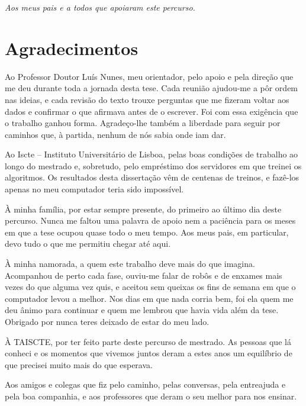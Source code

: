 \documentclass[12pt,reqno, twoside]{amsbook}
\theoremstyle{plain}
\numberwithin{equation}{chapter}
\newenvironment{dedication}
  {\thispagestyle{empty}
   \vspace*{\stretch{1}}
   \itshape
   \raggedleft
  }
  {\par
   \vspace{\stretch{3}}
  }
\numberwithin{section}{chapter}
\numberwithin{table}{chapter}
\numberwithin{figure}{chapter}
\begin{document}
\begin{dedication}
\begin{flushright}
\textit{Aos meus pais e a todos que apoiaram este percurso.}
\end{flushright}
\end{dedication}

\setcounter{page}{1}

\chapter*{Agradecimentos}
Ao Professor Doutor Luís Nunes, meu orientador, pelo apoio e pela direção que me deu durante toda a jornada desta tese. Cada reunião ajudou-me a pôr ordem nas ideias, e cada revisão do texto trouxe perguntas que me fizeram voltar aos dados e confirmar o que afirmava antes de o escrever. Foi com essa exigência que o trabalho ganhou forma. Agradeço-lhe também a liberdade para seguir por caminhos que, à partida, nenhum de nós sabia onde iam dar.

Ao Iscte -- Instituto Universitário de Lisboa, pelas boas condições de trabalho ao longo do mestrado e, sobretudo, pelo empréstimo dos servidores em que treinei os algoritmos. Os resultados desta dissertação vêm de centenas de treinos, e fazê-los apenas no meu computador teria sido impossível.

À minha família, por estar sempre presente, do primeiro ao último dia deste percurso. Nunca me faltou uma palavra de apoio nem a paciência para os meses em que a tese ocupou quase todo o meu tempo. Aos meus pais, em particular, devo tudo o que me permitiu chegar até aqui.

À minha namorada, a quem este trabalho deve mais do que imagina. Acompanhou de perto cada fase, ouviu-me falar de robôs e de enxames mais vezes do que alguma vez quis, e aceitou sem queixas os fins de semana em que o computador levou a melhor. Nos dias em que nada corria bem, foi ela quem me deu ânimo para continuar e quem me lembrou que havia vida além da tese. Obrigado por nunca teres deixado de estar do meu lado.

À TAISCTE, por ter feito parte deste percurso de mestrado. As pessoas que lá conheci e os momentos que vivemos juntos deram a estes anos um equilíbrio de que precisei muito mais do que esperava.

Aos amigos e colegas que fiz pelo caminho, pelas conversas, pela entreajuda e pela boa companhia, e aos professores que deram o seu melhor para nos ensinar.
\end{document}
